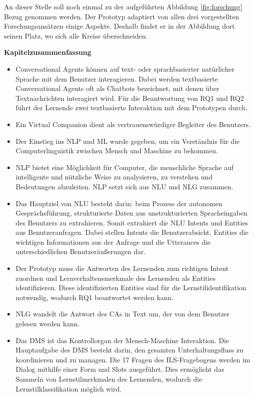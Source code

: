         An dieser Stelle soll noch einmal zu der aufgeführten Abbildung \ref{fig:forschung} Bezug genommen werden.
        Der Prototyp adaptiert von allen drei vorgestellten Forschungsansätzen einige Aspekte. Deshalb 
        findet er in der Abbildung dort seinen Platz, wo sich alle Kreise überschneiden. 

    \textbf{Kapitelzusammenfassung} 
    \begin{itemize}
        \item Conversational Agents können auf text- oder sprachbasierter natürlicher Sprache mit dem Benutzer interagieren. Dabei werden textbasierte Conversational Agents oft als Chatbots bezeichnet, mit denen über Textnachrichten interagiert wird. Für die Beantwortung von RQ1 und RQ2 führt der Lernende zwei textbasierte Interaktion mit dem Prototypen durch.
        \item Ein Virtual Companion dient als vertrauenswürdiger Begleiter des Benutzers.
        \item Der Einstieg ins NLP und ML wurde gegeben, um ein Verständnis für die Computerlinguistik zwischen Mensch und Maschine zu bekommen.
        \item NLP bietet eine Möglichkeit für Computer, die menschliche Sprache auf intelligente und nützliche Weise zu analysieren, zu verstehen und Bedeutungen abzuleiten.
        NLP setzt sich aus NLU und NLG zusammen.
        \item Das Hauptziel von NLU besteht darin: beim Prozess der autonomen Gesprächsführung, strukturierte Daten aus unstrukturierten Spracheingaben des Benutzers zu extrahieren.
        Somit extrahiert die NLU Intents und Entities aus Benutzeranfragen.
        Dabei stellen Intents die Benutzerabsicht, Entities die wichtigen Informationen aus der Anfrage und die Utterances die unterschiedlichen Benutzeräußerungen dar.
        \item Der Prototyp muss die Antworten des Lernenden zum richtigen Intent zuordnen und Lernverhaltensmerkmale des Lernenden als Entities identifizieren. Diese identifizierten Entities sind für die Lernstilidentifikation notwendig, wodurch RQ1 beantwortet werden kann.
        \item NLG wandelt die Antwort des CAs in Text um, der von dem Benutzer gelesen werden kann.
        \item Das DMS ist das Kontrollorgan der Mensch-Maschine Interaktion. Die Hauptaufgabe des DMS besteht darin, den gesamten Unterhaltungsfluss zu koordinieren und zu managen. Die 17 Fragen des ILS-Fragebogens werden im Dialog  mithilfe einer Form und Slots ausgeführt. Dies ermöglicht das Sammeln von Lernstilmerkmalen des Lernenden, wodurch die Lernstilklassifikation möglich wird. 

\end{itemize}
